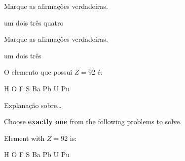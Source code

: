 \documentclass[a4paper,addpoints]{exam}
\begin{document}
\begin{multicols}{2}
\begin{questions}
\question[10] Marque as afirmações verdadeiras.
\addpoints
\begin{checkboxes}
	\choice um
	\choice dois
	\choice três
	\choice quatro
\end{checkboxes}

{%
	\checkboxchar{$\Box$} %
	\question[10] Marque as afirmações verdadeiras.
	\addpoints
	\begin{checkboxes}
		\choice um
		\choice dois
		\choice três
	\end{checkboxes}
}%

{%
	\renewcommand*\thechoice{\Roman{choice}}
	\renewcommand*\choicelabel{(\thechoice)}
	\question[10] O elemento que possui $Z=92$ é:
	\begin{multicols}{3}
		\begin{choices}
			\choice H
			\choice O
			\choice F
			\choice S
			\choice Ba
			\choice Pb
			\choice U
			\choice Pu
		\end{choices}
	\end{multicols}
}%


\question[10]
Explanação sobre\ldots
\makeemptybox{2cm}

\question[10] Choose\textbf{ exactly one} from the following problems to solve. 



{%
	\renewcommand*\thechoice{\arabic{choice}} 
	\renewcommand*\choicelabel{\thechoice)}
	\question[10] Element with $Z=92$ is:
	\begin{multicols}{2}
		\begin{choices}
			\choice H
			\choice O
			\choice F
			\choice S
			\choice Ba
			\choice Pb
			\choice U
			\choice Pu
		\end{choices}
	\end{multicols}
}%






\end{questions}
\end{multicols}
\end{document}
